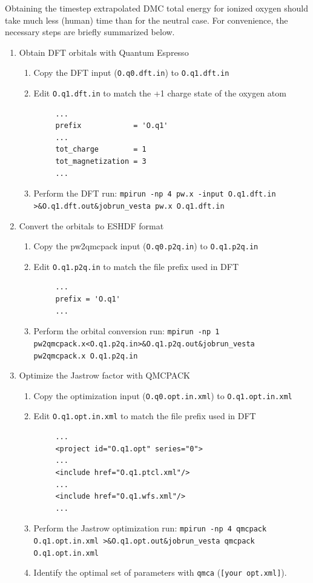 Obtaining the timestep extrapolated DMC total energy for ionized oxygen should take much less (human) time than for the neutral case.  For convenience, the necessary steps are briefly summarized below.
\begin{enumerate}
  \item{Obtain DFT orbitals with Quantum Espresso}
  \begin{enumerate}
    \item{Copy the DFT input (\texttt{O.q0.dft.in}) to \texttt{O.q1.dft.in}}
    \item{Edit \texttt{O.q1.dft.in} to match the +1 charge state of the oxygen atom}
    \begin{verbatim}
     ...
     prefix            = 'O.q1'
     ...
     tot_charge        = 1
     tot_magnetization = 3
     ...
    \end{verbatim}
    \item{Perform the DFT run: \ifws\verb|mpirun -np 4 pw.x -input O.q1.dft.in >&O.q1.dft.out&|\else\verb|jobrun_vesta pw.x O.q1.dft.in|\fi}
  \end{enumerate}

  \item{Convert the orbitals to ESHDF format}
  \begin{enumerate}
    \item{Copy the pw2qmcpack input (\texttt{O.q0.p2q.in}) to \texttt{O.q1.p2q.in}}
    \item{Edit \texttt{O.q1.p2q.in} to match the file prefix used in DFT}
    \begin{verbatim}
     ...
     prefix = 'O.q1'
     ...
    \end{verbatim}
    \item{Perform the orbital conversion run: \ifws\verb|mpirun -np 1 pw2qmcpack.x<O.q1.p2q.in>&O.q1.p2q.out&|\else\verb|jobrun_vesta pw2qmcpack.x O.q1.p2q.in|\fi}
  \end{enumerate}

  \item{Optimize the Jastrow factor with QMCPACK}
  \begin{enumerate}
    \item{Copy the optimization input (\texttt{O.q0.opt.in.xml}) to \texttt{O.q1.opt.in.xml}}
    \item{Edit \texttt{O.q1.opt.in.xml} to match the file prefix used in DFT}
    \begin{verbatim}
     ...
     <project id="O.q1.opt" series="0">
     ...
     <include href="O.q1.ptcl.xml"/>
     ...
     <include href="O.q1.wfs.xml"/>
     ...
    \end{verbatim}
    \item{Perform the Jastrow optimization run: \ifws\verb|mpirun -np 4 qmcpack O.q1.opt.in.xml >&O.q1.opt.out&|\else\verb|jobrun_vesta qmcpack O.q1.opt.in.xml|\fi}
    \item{Identify the optimal set of parameters with \texttt{qmca} (\verb|[your opt.xml]|).}
  \end{enumerate}


\end{enumerate}
